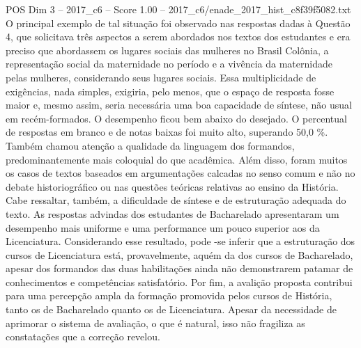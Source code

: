 \begin{textsample}{POS Dim 3 – 2017\_c6 – Score 1.00 – 2017\_c6/enade\_2017\_hist\_c8f39f5082.txt}
O principal exemplo de tal situação foi observado nas respostas dadas à Questão 4, que solicitava três aspectos a serem abordados nos textos dos estudantes e era preciso que abordassem os lugares sociais das mulheres no Brasil Colônia, a representação social da maternidade no período e a vivência da maternidade pelas mulheres, considerando seus lugares sociais.
Essa multiplicidade de exigências, nada simples, exigiria, pelo menos, que o espaço de resposta fosse maior e, mesmo assim, seria necessária uma boa capacidade de síntese, não usual em recém-formados.
O desempenho ficou bem abaixo do desejado.
O percentual de respostas em branco e de notas baixas foi muito alto, superando 50,0 \%.
Também chamou atenção a qualidade da linguagem dos formandos, predominantemente mais coloquial do que acadêmica.
Além disso, foram muitos os casos de textos baseados em argumentações calcadas no senso comum e não no debate historiográfico ou nas questões teóricas relativas ao ensino da História.
Cabe ressaltar, também, a dificuldade de síntese e de estruturação adequada do texto.
As respostas advindas dos estudantes de Bacharelado apresentaram um desempenho mais uniforme e uma performance um pouco superior aos da Licenciatura.
Considerando esse resultado, pode -se inferir que a estruturação dos cursos de Licenciatura está, provavelmente, aquém da dos cursos de Bacharelado, apesar dos formandos das duas habilitações ainda não demonstrarem patamar de conhecimentos e competências satisfatório.
Por fim, a avalição proposta contribui para uma percepção ampla da formação promovida pelos cursos de História, tanto os de Bacharelado quanto os de Licenciatura.
Apesar da necessidade de aprimorar o sistema de avaliação, o que é natural, isso não fragiliza as constatações que a correção revelou.

\end{textsample}
